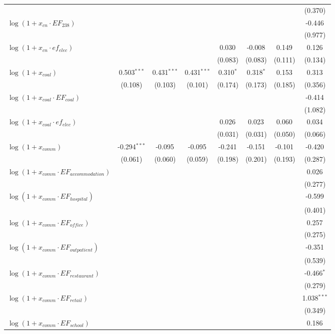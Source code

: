 \begin{longtable}[h]{lccccccc}
  & & & & & & & (0.370) \\
$\log(1 + x_{cn}\cdot EF_{238})$ & & & & & & & -0.446$^{}$ \\
  & & & & & & & (0.977) \\
$\log(1 + x_{cn} \cdot ef_{elec})$ & & & & 0.030$^{}$ & -0.008$^{}$ & 0.149$^{}$ & 0.126$^{}$ \\
  & & & & (0.083) & (0.083) & (0.111) & (0.134) \\
$\log(1 + x_{coal})$ & 0.503$^{***}$ & 0.431$^{***}$ & 0.431$^{***}$ & 0.310$^{*}$ & 0.318$^{*}$ & 0.153$^{}$ & 0.313$^{}$ \\
  & (0.108) & (0.103) & (0.101) & (0.174) & (0.173) & (0.185) & (0.356) \\

$\log(1 + x_{coal}\cdot EF_{coal})$ & & & & & & & -0.414$^{}$ \\
  & & & & & & & (1.082) \\
$\log(1 + x_{coal}\cdot ef_{elec})$ & & & & 0.026$^{}$ & 0.023$^{}$ & 0.060$^{}$ & 0.034$^{}$ \\
  & & & & (0.031) & (0.031) & (0.050) & (0.066) \\
$\log(1 + x_{comm})$ & -0.294$^{***}$ & -0.095$^{}$ & -0.095$^{}$ & -0.241$^{}$ & -0.151$^{}$ & -0.101$^{}$ & -0.420$^{}$ \\
  & (0.061) & (0.060) & (0.059) & (0.198) & (0.201) & (0.193) & (0.287) \\
$\log(1 + x_{comm}\cdot EF_{accommodation})$ & & & & & & & 0.026$^{}$ \\
  & & & & & & & (0.277) \\
$\log(1 + x_{comm}\cdot EF_{hospital})$ & & & & & & & -0.599$^{}$ \\
  & & & & & & & (0.401) \\
$\log(1 + x_{comm}\cdot EF_{office})$ & & & & & & & 0.257$^{}$ \\
  & & & & & & & (0.275) \\
$\log(1 + x_{comm}\cdot EF_{outpatient})$ & & & & & & & -0.351$^{}$ \\
  & & & & & & & (0.539) \\
$\log(1 + x_{comm}\cdot EF_{restaurant})$ & & & & & & & -0.466$^{*}$ \\
  & & & & & & & (0.279) \\
$\log(1 + x_{comm}\cdot EF_{retail})$ & & & & & & & 1.038$^{***}$ \\
  & & & & & & & (0.349) \\
$\log(1 + x_{comm}\cdot EF_{school})$ & & & & & & & 0.186$^{}$ \\

\end{longtable}
